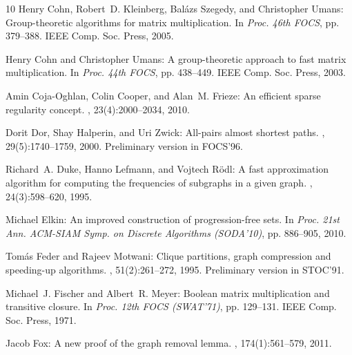 \begin{thebibliography}{10}
{\sc Henry Cohn, Robert~D. Kleinberg, Bal{\'a}zs Szegedy, and Christopher
  Umans}: Group-theoretic algorithms for matrix multiplication.
\newblock In {\em Proc. 46th FOCS}, pp. 379--388. IEEE Comp. Soc. Press, 2005.

{\sc Henry Cohn and Christopher Umans}: A group-theoretic approach to fast
  matrix multiplication.
\newblock In {\em Proc. 44th FOCS}, pp. 438--449. IEEE Comp. Soc. Press, 2003.

{\sc Amin Coja-Oghlan, Colin Cooper, and Alan~M. Frieze}: An efficient sparse
  regularity concept.
, 23(4):2000--2034, 2010.
\newblock [\epfmtdoi{10.1137/080730160}]

{\sc Dorit Dor, Shay Halperin, and Uri Zwick}: All-pairs almost shortest paths.
, 29(5):1740--1759, 2000.
\newblock Preliminary version in FOCS'96.
\newblock [\epfmtdoi{10.1137/S0097539797327908}]

{\sc Richard~A. Duke, Hanno Lefmann, and Vojtech R{\"o}dl}: A fast
  approximation algorithm for computing the frequencies of subgraphs in a given
  graph.
, 24(3):598--620, 1995.
\newblock [\epfmtdoi{10.1137/S0097539793247634}]

{\sc Michael Elkin}: An improved construction of progression-free sets.
\newblock In {\em Proc. 21st Ann. ACM-SIAM Symp. on Discrete Algorithms
  (SODA'10)}, pp. 886--905, 2010.

{\sc Tom{\'a}s Feder and Rajeev Motwani}: Clique partitions, graph compression
  and speeding-up algorithms.
, 51(2):261--272, 1995.
\newblock Preliminary version in STOC'91.

{\sc Michael~J. Fischer and Albert~R. Meyer}: {B}oolean matrix multiplication
  and transitive closure.
\newblock In {\em Proc. 12th FOCS (SWAT'71)}, pp. 129--131. IEEE Comp. Soc.
  Press, 1971.

{\sc Jacob Fox}: A new proof of the graph removal lemma.
, 174(1):561--579, 2011.


\end{thebibliography}
